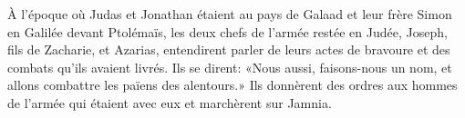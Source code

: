À l’époque où Judas et Jonathan étaient au pays de Galaad
	et leur frère Simon en Galilée devant Ptolémaïs,
	les deux chefs de l’armée restée en Judée, Joseph, fils de Zacharie, et Azarias,
	entendirent parler de leurs actes de bravoure et des combats qu’ils avaient livrés.
Ils se dirent: «Nous aussi, faisons-nous un nom,
	et allons combattre les païens des alentours.»
Ils donnèrent des ordres aux hommes de l’armée qui étaient avec eux
	et marchèrent sur Jamnia.
